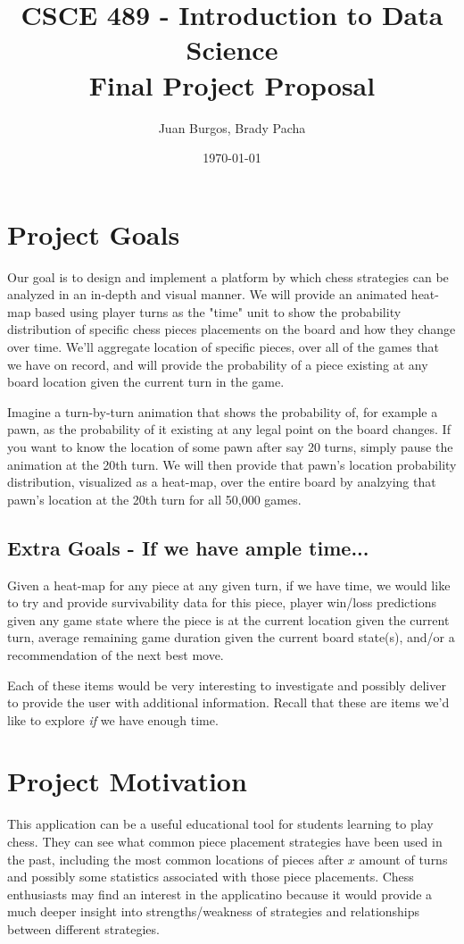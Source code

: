 \documentclass[a4paper,10pt,oneside,leqno,titlepage,onecolumn]{article}
\title{CSCE 489 - Introduction to Data Science \\ Final Project Proposal}
\author{Juan Burgos, Brady Pacha}
\date{\today}
\begin{document}
\maketitle

\section*{Project Goals}
Our goal is to design and implement a platform by which chess strategies can be analyzed 
in an in-depth and visual manner. We will provide an animated heat-map based using 
player turns as the "time" unit to show the probability distribution of specific chess 
pieces placements on the board and how they change over time. We'll aggregate location 
of specific pieces, over all of the games that we have on record, and will provide the 
probability of a piece existing at any board location given the current turn in the 
game. 

Imagine a turn-by-turn animation that shows the probability of, for example a pawn, as 
the probability of it existing at any legal point on the board changes. If you want to 
know the location of some pawn after say 20 turns, simply pause the animation at the 
20th turn. We will then provide that pawn's location probability distribution, 
visualized as a heat-map, over the entire board by analzying that pawn's location at the 
20th turn for all 50,000 games.

\subsection*{Extra Goals - If we have ample time...}
Given a heat-map for any piece at any given turn, if we have time, we would like to try 
and provide survivability data for this piece, player win/loss predictions given any 
game state where the piece is at the current location given the current turn, average 
remaining game duration given the current board state(s), and/or a recommendation of the 
next best move.

Each of these items would be very interesting to investigate and possibly deliver to 
provide the user with additional information. Recall that these are items we'd like to 
explore \emph{if} we have enough time.


\section*{Project Motivation}
This application can be a useful educational tool for students learning to play chess. 
They can see what common piece placement strategies have been used in the past, 
including the most common locations of pieces after $x$ amount of turns and possibly 
some statistics associated with those piece placements. Chess enthusiasts may find an 
interest in the applicatino because it would provide a much deeper insight into 
strengths/weakness of strategies and relationships between different strategies.
\end{document}
